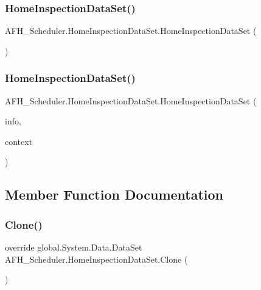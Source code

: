 \subsubsection{HomeInspectionDataSet()\hspace{0.1cm}{\footnotesize\ttfamily [1/2]}}
{\footnotesize\ttfamily A\+F\+H\+\_\+\+Scheduler.\+Home\+Inspection\+Data\+Set.\+Home\+Inspection\+Data\+Set (\begin{DoxyParamCaption}{ }\end{DoxyParamCaption})}

\mbox{\label{class_a_f_h___scheduler_1_1_home_inspection_data_set_a77cb4d3e09e1fb77c76e9261b38c7593}} 
\subsubsection{HomeInspectionDataSet()\hspace{0.1cm}{\footnotesize\ttfamily [2/2]}}
{\footnotesize\ttfamily A\+F\+H\+\_\+\+Scheduler.\+Home\+Inspection\+Data\+Set.\+Home\+Inspection\+Data\+Set (\begin{DoxyParamCaption}\item[{global\+::\+System.\+Runtime.\+Serialization.\+Serialization\+Info}]{info,  }\item[{global\+::\+System.\+Runtime.\+Serialization.\+Streaming\+Context}]{context }\end{DoxyParamCaption})\hspace{0.3cm}{\ttfamily [protected]}}



\subsection{Member Function Documentation}
\mbox{\label{class_a_f_h___scheduler_1_1_home_inspection_data_set_a0c26672e3af1576d1e41972377c41660}} 
\subsubsection{Clone()}
{\footnotesize\ttfamily override global.\+System.\+Data.\+Data\+Set A\+F\+H\+\_\+\+Scheduler.\+Home\+Inspection\+Data\+Set.\+Clone (\begin{DoxyParamCaption}{ }\end{DoxyParamCaption})}


